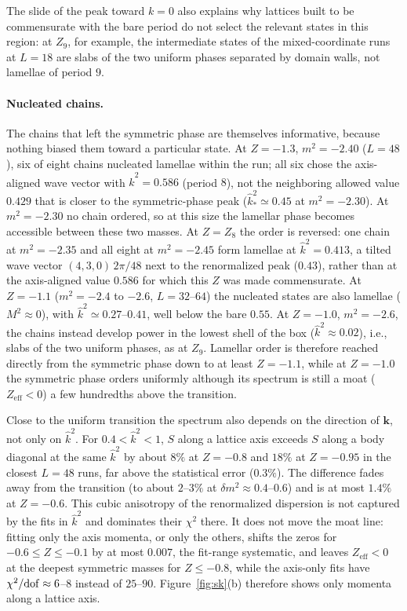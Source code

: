 \documentclass[aps,prd,twocolumn,superscriptaddress,nofootinbib,10pt]{revtex4-2}
\newcommand{\khat}{\widehat{k}^{2}}
\newcommand{\eff}{\mathrm{eff}}
\begin{document}
The slide of the peak toward $k=0$ also explains why lattices built to be commensurate with the bare period
do not select the relevant states in this region: at $Z_9$, for example, the
intermediate states of the mixed-coordinate runs at $L=18$ are slabs of the
two uniform phases separated by domain walls, not lamellae of period $9$.

\paragraph*{Nucleated chains.}\label{sec:sk-nucl}
The chains that left the symmetric phase are themselves informative,
because nothing biased them toward a particular state.  At $Z=-1.3$,
$m^2=-2.40$ ($L=48$), six of eight chains nucleated lamellae within the run;
all six chose the axis-aligned wave vector with $\khat=0.586$ (period $8$),
not the neighboring allowed value $0.429$ that is closer to the
symmetric-phase peak ($\khat_*\simeq0.45$ at $m^2=-2.30$).  At $m^2=-2.30$
no chain ordered, so at this size the lamellar phase becomes
accessible between these two masses.  At $Z=Z_8$ the order is reversed:
one chain at $m^2=-2.35$ and all eight at $m^2=-2.45$ form lamellae at
$\khat=0.413$, a tilted wave vector $(4,3,0)\,2\pi/48$ next to the
renormalized peak ($0.43$), rather than at the axis-aligned value $0.586$
for which this $Z$ was made commensurate.  At $Z=-1.1$ ($m^2=-2.4$ to $-2.6$,
$L=32$--$64$) the nucleated states are also lamellae ($M^2\approx0$),
with $\khat\simeq0.27$--$0.41$, well below the bare $0.55$.  At $Z=-1.0$,
$m^2=-2.6$, the chains instead develop power in the lowest shell of the
box ($\khat\approx0.02$), i.e., slabs of the two uniform phases, as at
$Z_9$.  Lamellar order is
therefore reached directly from the symmetric phase down to at least
$Z=-1.1$, while at $Z=-1.0$ the symmetric phase orders uniformly although
its spectrum is still a moat ($Z_\eff<0$) a few hundredths above the
transition.

Close to the uniform transition the spectrum also depends on the direction
of $\mathbf k$, not only on $\khat$.  For $0.4<\khat<1$, $S$ along a lattice
axis exceeds $S$ along a body diagonal at the same $\khat$ by about
$8\%$ at $Z=-0.8$ and $18\%$ at $Z=-0.95$ in the closest $L=48$ runs, far
above the statistical error ($0.3\%$).  The difference fades away from the
transition (to about $2$--$3\%$ at $\delta m^2\approx0.4$--$0.6$) and is at most $1.4\%$
at $Z=-0.6$.  This cubic anisotropy of the renormalized dispersion is not
captured by the fits in $\khat$ and dominates their $\chi^2$ there.  It
does not move the moat line: fitting only the axis momenta, or only the
others, shifts the zeros for $-0.6\le Z\le-0.1$ by at most $0.007$, the
fit-range systematic, and leaves $Z_\eff<0$ at the deepest symmetric masses
for $Z\le-0.8$, while the axis-only fits have $\chi^2/{\rm dof}\approx6$--$8$
instead of $25$--$90$.  Figure~\ref{fig:sk}(b)
therefore shows only momenta along a lattice axis.
\end{document}
